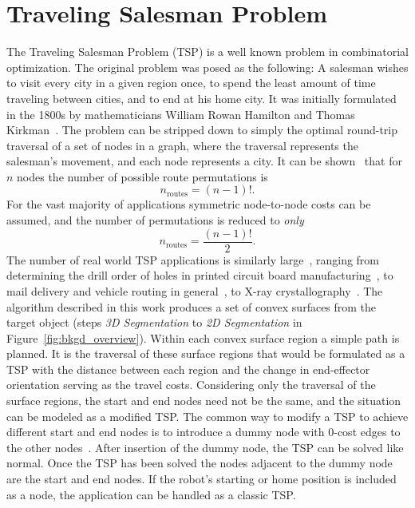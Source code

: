 \section{Traveling Salesman Problem}
The Traveling Salesman Problem (TSP) is a well known problem in combinatorial optimization.
The original problem was posed as the following:
A salesman wishes to visit every city in a given region once, to spend the least amount of time traveling between cities, and to end at his home city.
It was initially formulated in the 1800s by mathematicians William Rowan Hamilton and Thomas Kirkman~\cite{Graph_theory}.
The problem can be stripped down to simply the optimal round-trip traversal of a set of nodes in a graph, where the traversal represents the salesman's movement, and each node represents a city.
It can be shown~\cite{TSP_in_pursuit_of} that for $n$ nodes the number of possible route permutations is
\begin{equation*}
	n_{\text{routes}} = (n-1)!.
\end{equation*}
For the vast majority of applications symmetric node-to-node costs can be assumed, and the number of permutations is reduced to \textit{only}
\begin{equation*}
	n_{\text{routes}} = \frac{(n-1)!}{2}.
\end{equation*}
The number of real world TSP applications is similarly large~\cite{TSP_theory_applications}, ranging from determining the drill order of holes in printed circuit board manufacturing~\cite{TSP_PCB_manufacturing}, to mail delivery and vehicle routing in general~\cite{TSP_mail_delivery}, to X-ray crystallography~\cite{TSP_xray_crystallography}.
The algorithm described in this work produces a set of convex surfaces from the target object (steps \textit{3D Segmentation} to \textit{2D Segmentation} in Figure~\ref{fig:bkgd_overview}).
Within each convex surface region a simple path is planned.
It is the traversal of these surface regions that would be formulated as a TSP with the distance between each region and the change in end-effector orientation serving as the travel costs.
Considering only the traversal of the surface regions, the start and end nodes need not be the same, and the situation can be modeled as a modified TSP.
The common way to modify a TSP to achieve different start and end nodes is to introduce a dummy node with 0-cost edges to the other nodes~\cite{TSP_dummy_node_mod}.
After insertion of the dummy node, the TSP can be solved like normal.
Once the TSP has been solved the nodes adjacent to the dummy node are the start and end nodes.
If the robot's starting or home position is included as a node, the application can be handled as a classic TSP.

